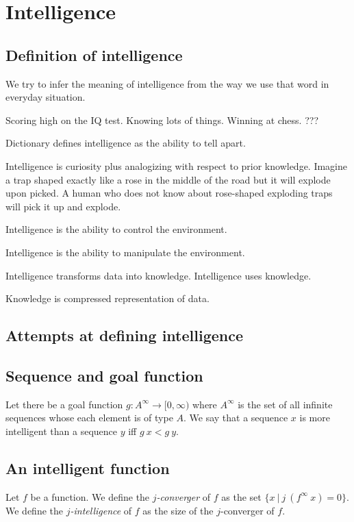 \chapter{Intelligence}

\section{Definition of intelligence}

We try to infer the meaning of intelligence
from the way we use that word in everyday situation.

Scoring high on the IQ test.
Knowing lots of things.
Winning at chess.
???

Dictionary defines intelligence as the ability to tell apart.

Intelligence is curiosity plus analogizing with respect to prior knowledge.
Imagine a trap shaped exactly like a rose in the middle of the road but it will explode upon picked.
A human who does not know about rose-shaped exploding traps will pick it up and explode.

Intelligence is the ability to control the environment.

Intelligence is the ability to manipulate the environment.

Intelligence transforms data into knowledge.
Intelligence uses knowledge.

Knowledge is compressed representation of data.

\section{Attempts at defining intelligence}

\section{Sequence and goal function}

Let there be a goal function \(g : A^\infty \to [0,\infty)\)
where \(A^\infty\) is the set of all infinite sequences whose each element is of type \(A\).
We say that a sequence \(x\) is more intelligent than a sequence \(y\) iff \(g~x < g~y\).

\section{An intelligent function}

Let \(f\) be a function.
We define the \emph{\(j\)-converger} of \(f\)
as the set \( \{ x ~|~ j~(f^\infty~x) = 0 \} \).
We define the \emph{\(j\)-intelligence} of \(f\)
as the size of the \(j\)-converger of \(f\).

